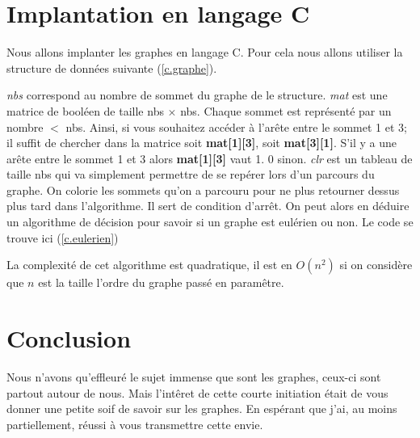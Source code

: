 \documentclass[12pt,a4paper]{scrartcl}
\theoremstyle{plain}
\theoremstyle{remark}
\begin{document}
\section{Implantation en langage C}

Nous allons implanter les graphes en langage C. Pour cela nous allons utiliser la structure de données suivante (\ref{c.graphe}).


\label{c.graphe}
\textit{nbs} correspond au nombre de sommet du graphe de le structure. \textit{mat} est une matrice de booléen de taille  nbs $\times$ nbs. Chaque sommet est représenté par un nombre $<$ nbs. Ainsi, si vous souhaitez accéder à l'arête entre le sommet 1 et 3; il suffit de chercher dans la matrice soit \textbf{mat[1][3]}, soit \textbf{mat[3][1]}. S'il y a une arête entre le sommet 1 et 3 alors \textbf{mat[1][3]} vaut 1. 0 sinon. \textit{clr} est un tableau de taille nbs qui va simplement permettre de se repérer lors d'un parcours du graphe. On colorie les sommets qu'on a parcouru pour ne plus retourner dessus plus tard dans l'algorithme. Il sert de condition d'arrêt.
On peut alors en déduire un algorithme de décision pour savoir si un graphe est eulérien ou non. Le code se trouve ici (\ref{c.eulerien})

\label{c.eulerien}

La complexité de cet algorithme est quadratique, il est en $O(n^2)$ si on considère que $n$ est la taille l'ordre du graphe passé en paramêtre.

\section{Conclusion}

Nous n'avons qu'effleuré le sujet immense que sont les graphes, ceux-ci sont partout autour de nous. Mais l'intêret de cette courte initiation était de vous donner une petite soif de savoir sur les graphes. En espérant que j'ai, au moins partiellement, réussi à vous transmettre cette envie.


\end{document}

